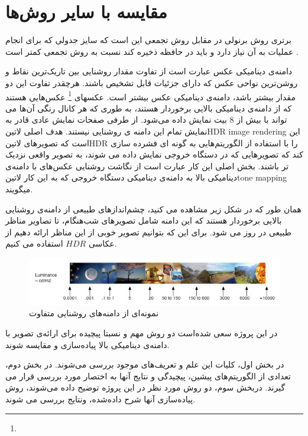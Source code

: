 \section{ مقایسه با سایر روش‌ها}
برتری روش برنولی در مقابل روش تجمعی این است که سایز جدولی که برای انجام عملیات به آن نیاز دارد و باید در حافظه ذخیره کند نسبت به روش تجمعی کمتر است . 







دامنه‌ی دینامیکی
عکس عبارت است از تفاوت مقدار روشنایی بین تاریک‌ترین نقاط و روشن‌ترین نواحی عکس که دارای جزئیات قابل تشخیص باشند. هرچقدر تفاوت این دو مقدار بیشتر باشد، دامنه‌ی دینامیکی عکس بیشتر است. عکسهای
\footnote{}
   عکس‌هایی هستند که از دامنه‌ی دینامیکی بالایی برخوردار هستند، به طوری که هر کانال رنگی آن‌ها می تواند با بیش از 8 بیت نمایش داده می‌شود. 
از طرفی صفحات نمایش عادی قادر به نمایش تمام این دامنه ی روشنایی نیستند. 
هدف اصلی 
‌لاتین{HDR image rendering }
 این است که تصویر‌های 
 ‌لاتین{HDR }
 را با استفاده از الگوریتم‌هایی به  گونه ای فشرده سازی کند که تصویر‌هایی که در دستگاه خروجی نمایش داده می شوند، به تصویر واقعی نزدیک تر باشند.
بخش اصلی این کار عبارت است از نگاشت روشنایی عکس‌های با دامنه‌ی دینامیکی بالا به دامنه‌ی دینامیکی دستگاه خروجی که به این کار 
 ‌لاتین{tone mapping }
 میگویند.
 
همان طور که در شکل زیر مشاهده می کنید، چشم‌اندازهای طبیعی از دامنه‌ی روشنایی بالایی برخوردار هستند که این دامنه شامل تصویرهای شب‌هنگام، تا تصاویر مناظر طبیعی در روز می شود. برای این که بتوانیم تصویر خوبی از این مناظر ارائه دهیم از عکاسی $HDR$ استفاده می کنیم.
 
 \begin{figure}[!htb]
 	\includegraphics[width=\linewidth]{images/luminancerange}
 	\caption{نمونه‌ای از دامنه‌های روشنایی متفاوت}\label{fig:logtonemap}
 	\endminipage\hfill
 \end{figure}
 


 در این پروژه سعی شده‌است دو  روش  مهم و نسبتا پیچیده برای ارائه‌ی تصویر با دامنه‌ی دینامیکی بالا پیاده‌سازی و مقایسه شوند.
 
 در بخش اول، کلیات این علم و تعریف‌های موجود بررسی می‌شوند. در بخش دوم، تعدادی از الگوریتم‌های پیشین، پیچیدگی و نتایج آنها به اختصار مورد بررسی قرار می گیرند. دربخش سوم، دو روش  مورد نظر در این پروژه توضیح داده می‌شوند، روش پیاده‌سازی آنها شرح داده‌شده، ونتایج بررسی می شوند.
 
